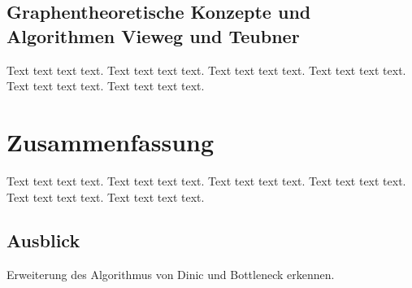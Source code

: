 \documentclass[a4paper]{llncs}
\begin{document}
\subsection{Graphentheoretische Konzepte und Algorithmen Vieweg und Teubner}
Text text text text. Text text text text. Text text text text. Text text text text. Text text text text. Text text text text. 
\section{Zusammenfassung}
\label{Zusammenfassung}
Text text text text. Text text text text. Text text text text. Text text text text. Text text text text. Text text text text. 

\subsection{Ausblick}
Erweiterung des Algorithmus von Dinic und Bottleneck erkennen.


 
\end{document}
